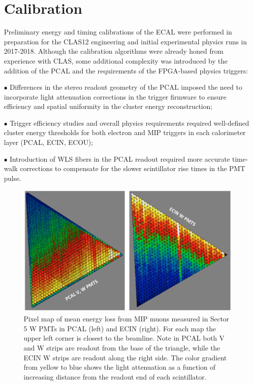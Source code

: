 \section{Calibration}
\label{Calibration}

Preliminary energy and timing calibrations of the ECAL were performed in preparation for the CLAS12 engineering
and initial experimental physics runs in 2017-2018. Although the calibration algorithms were already honed from
experience with CLAS, some additional complexity was introduced by the addition of the PCAL and the
requirements of the FPGA-based physics triggers: 

$\bullet$ Differences in the stereo readout geometry of the PCAL imposed the need to incorporate light
attenuation corrections in the trigger firmware to ensure efficiency and spatial uniformity in the cluster energy
reconstruction;

$\bullet$ Trigger efficiency studies and overall physics requirements required well-defined cluster energy
thresholds for both electron and MIP triggers in each calorimeter layer (PCAL, ECIN, ECOU);

$\bullet$ Introduction of WLS fibers in the PCAL readout required more accurate time-walk corrections to
compensate for the slower scintillator rise times in the PMT pulse.

\begin{figure}[hbt]
\centering
\includegraphics[width=1.0\columnwidth,keepaspectratio]{img/S9_1_1.png}
\caption[]{Pixel map of mean energy loss from MIP muons measured in Sector 5 W PMTs in PCAL (left) and ECIN
  (right). For each map the upper left corner is closest to the beamline. Note in PCAL both V and W strips are
  readout from the base of the triangle, while the ECIN W strips are readout along the right side. The color
  gradient from yellow to blue shows the light attenuation as a function of increasing distance from the readout
  end of each scintillator.}
\label{fig:S9_1_1}
\end{figure}

